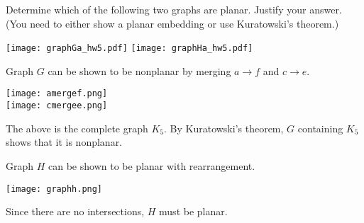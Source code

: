 
\begin{problem}
Determine which of the following two graphs are planar.
Justify your answer. (You need to either show a planar embedding or
use Kuratowski's theorem.)

	\begin{center}
		\texttt{[image: graphGa\_hw5.pdf]}
		\hfill
		\texttt{[image: graphHa\_hw5.pdf]}
	\end{center}

\end{problem}

\begin{solution}
Graph $G$ can be shown to be nonplanar by merging $a\to f$ and $c\to e$.

\begin{center}
  \texttt{[image: amergef.png]} \\
  \texttt{[image: cmergee.png]}
  \end{center}

The above is the complete graph $K_5$. By Kuratowski's theorem, $G$ containing $K_5$ shows that it is nonplanar.

\bigskip
\bigskip
\bigskip

Graph $H$ can be shown to be planar with rearrangement.

\begin{center}
		\texttt{[image: graphh.png]}
\end{center}

Since there are no intersections, $H$ must be planar.
\end{solution}



